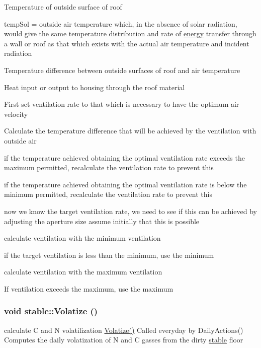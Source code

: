 Temperature of outside surface of roof

tempSol = outside air temperature which, in the absence of solar radiation, would give the same temperature distribution and rate of \hyperlink{classenergy}{energy} transfer through a wall or roof as that which exists with the actual air temperature and incident radiation

Temperature difference between outside surfaces of roof and air temperature

Heat input or output to housing through the roof material

First set ventilation rate to that which is necessary to have the optimum air velocity

Calculate the temperature difference that will be achieved by the ventilation with outside air

if the temperature achieved obtaining the optimal ventilation rate exceeds the maximum permitted, recalculate the ventilation rate to prevent this

if the temperature achieved obtaining the optimal ventilation rate is below the minimum permitted, recalculate the ventilation rate to prevent this

now we know the target ventilation rate, we need to see if this can be achieved by adjusting the aperture size assume initially that this is possible

calculate ventilation with the minimum ventilation

if the target ventilation is less than the minimum, use the minimum

calculate ventilation with the maximum ventilation

If ventilation exceeds the maximum, use the maximum \hypertarget{classstable_ab2278527e43d05badfe1e09e619330e2}{
\subsubsection[{Volatize}]{\setlength{\rightskip}{0pt plus 5cm}void stable::Volatize ()}}
\label{classstable_ab2278527e43d05badfe1e09e619330e2}


calculate C and N volatilization \hyperlink{classstable_ab2278527e43d05badfe1e09e619330e2}{Volatize()} Called everyday by DailyActions() Computes the daily volatization of N and C gasses from the dirty \hyperlink{classstable}{stable} floor 

